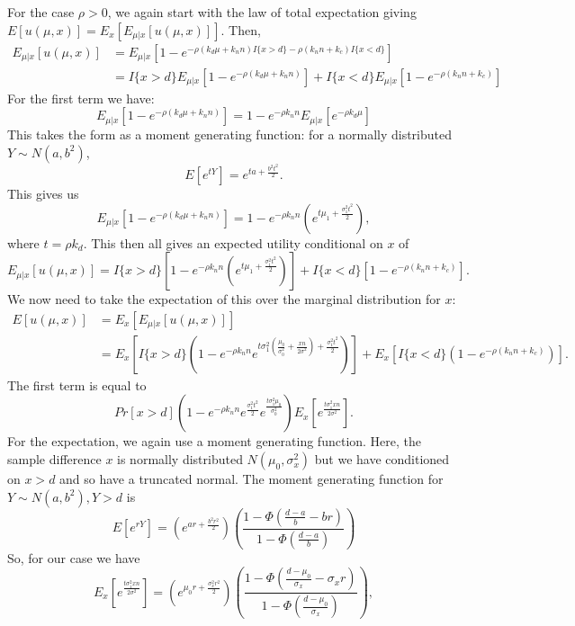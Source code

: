 \documentclass[sagev, Crown]{sagej}
\begin{document}
For the case $\rho > 0$, we again start with the law of total expectation giving $E[u(\mu, x)] = E_x\left[ E_{\mu | x} [u(\mu, x)] \right]$. Then,
\begin{align*}
E_{\mu | x} [u(\mu, x)] &= E_{\mu | x}[1 - e^{-\rho(k_d\mu + k_n n) I\{x > d\} -\rho(k_n n + k_c) I\{x < d\}}] \\
&= I\{x > d\} E_{\mu | x}[1 - e^{-\rho(k_d\mu + k_n n)}] + I\{x < d\}E_{\mu | x}[1 - e^{-\rho(k_n n + k_c)}]
\end{align*}
For the first term we have:
$$
E_{\mu | x}[1 - e^{-\rho(k_d\mu + k_n n)}] = 1 - e^{-\rho k_n n} E_{\mu | x}[e^{-\rho k_d \mu}]
$$
This takes the form as a moment generating function: for a normally distributed $Y \sim N(a, b^2)$,
$$
E[e^{tY}] = e^{ta + \frac{b^2 t^2}{2}}.
$$
This gives us
$$
E_{\mu | x}[1 - e^{-\rho(k_d\mu + k_n n)}] = 1 - e^{-\rho k_n n} \left(e^{t\mu_1 + \frac{\sigma_1^2 t^2}{2}} \right),
$$
where $t = \rho k_d$. This then all gives an expected utility conditional on $x$ of
$$
E_{\mu | x} [u(\mu, x)] = I\{x > d\} \left[1 - e^{-\rho k_n n} \left(e^{t\mu_1 + \frac{\sigma_1^2 t^2}{2}} \right) \right] + I\{x < d\}\left[1 - e^{-\rho(k_n n + k_c)}\right].
$$
We now need to take the expectation of this over the marginal distribution for $x$:
$$
\begin{aligned}
E[u(\mu, x)] &= E_x\left[ E_{\mu | x} [u(\mu, x)] \right] \\
 &= E_x\left[ I\{x > d\} \left(1 - e^{-\rho k_n n} e^{t\sigma_1^2(\frac{\mu_0}{\sigma_0^2} + \frac{xn}{2\sigma^2}) + \frac{\sigma_1^2 t^2}{2}} \right) \right] + 
 E_x\left[ I\{x < d\}\left(1 - e^{-\rho(k_n n + k_c)}\right) \right].
\end{aligned}
$$
The first term is equal to
$$
Pr[x > d] \left( 1 - e^{-\rho k_n n} e^{\frac{\sigma_1^2 t^2}{2}} e^{\frac{t\sigma_1^2 \mu_0}{\sigma_0^2}}   \right) E_x \left[ e^{\frac{t\sigma_1^2 x n}{2\sigma^2}} \right].
$$
For the expectation, we again use a moment generating function. Here, the sample difference $x$ is normally distributed $N(\mu_0, \sigma_x^2)$ but we have conditioned on $x > d$ and so have a truncated normal. The moment generating function for $Y \sim N(a,b^2), Y > d$ is
$$
E[e^{rY}] =  \left( e^{ar + \frac{b^2 r^2}{2} } \right) \left(\frac{1 - \Phi(\frac{d-a}{b} - br)}{1 - \Phi(\frac{d-a}{b} )} \right)
$$
So, for our case we have
$$
 E_x \left[ e^{\frac{t\sigma_1^2 x n}{2\sigma^2}} \right] = \left( e^{\mu_0 r + \frac{\sigma_x^2 r^2}{2} } \right) \left(\frac{1 - \Phi(\frac{d-\mu_0}{\sigma_x} - \sigma_x r)}{1 - \Phi(\frac{d-\mu_0}{\sigma_x})} \right),
$$
\end{document}

